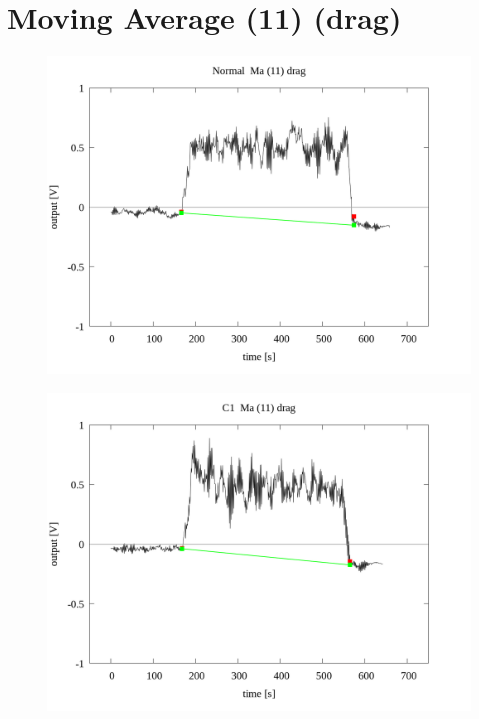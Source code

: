 \documentclass[a4paper]{jsarticle}
\author{}
\title{}
\date{}
\begin{document}
\section{Moving Average (11) (drag)}

\begin{figure}[htbp]
    \footnotesize
    \begin{center}
        \includegraphics[width=140mm]{../../../../33_result/210806/moving_average/11/drag/03/Normal_ma(11)_drag_03.png}
    \end{center}
\end{figure}

\begin{figure}[htbp]
    \footnotesize
    \begin{center}
        \includegraphics[width=140mm]{../../../../33_result/210806/moving_average/11/drag/03/C1_ma(11)_drag_03.png}
    \end{center}
\end{figure}
\end{document}
